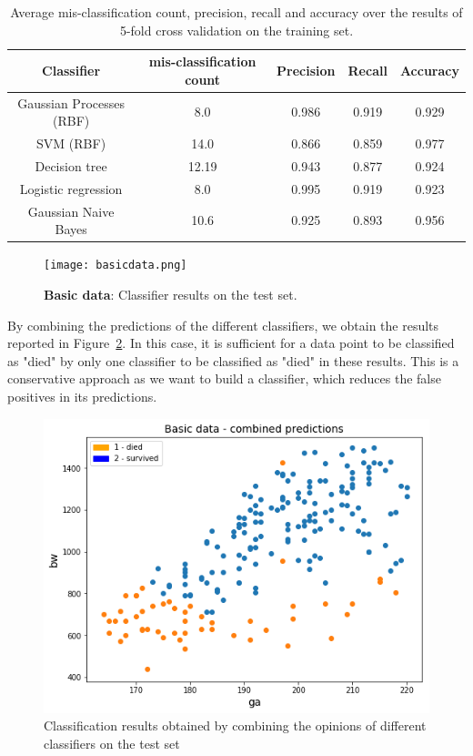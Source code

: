 \documentclass[a4paper,11pt]{article}
\begin{document}
\begin{table}[H]
    \centering
    \begin{tabular}{|c|c|c|c|c|}
    \hline
        Classifier & mis-classification count & Precision & Recall & Accuracy \\
    \hline
        Gaussian Processes (RBF)& 8.0   & 0.986 & 0.919 & 0.929\\
        SVM (RBF)               & 14.0  & 0.866 & 0.859 & 0.977\\
        Decision tree           & 12.19 & 0.943 & 0.877 & 0.924\\
        Logistic regression     & 8.0   & 0.995 & 0.919 & 0.923\\
        Gaussian Naive Bayes    & 10.6  & 0.925 & 0.893 & 0.956\\
    \hline
    \end{tabular}
    \caption{Average mis-classification count, precision, recall and accuracy over the results of 5-fold cross validation on the training set.}
    \label{tab:basicdatascores}
\end{table}

\begin{figure}[H]
    \centering
    \texttt{[image: basicdata.png]}
    \caption{\textbf{Basic data}: Classifier results on the test set.}
    \label{fig:basicdatatest}
\end{figure}

By combining the predictions of the different classifiers, we obtain the results reported in Figure~\ref{fig:basicdatacomb}. In this case, it is sufficient for a data point to be classified as "died" by only one classifier to be classified as "died" in these results. This is a conservative approach as we want to build a classifier, which reduces the false positives in its predictions.

\begin{figure}[H]
    \centering
    \includegraphics[width=0.7\linewidth]{basic_data_combined.png}
    \caption{Classification results obtained by combining the opinions of different classifiers on the test set}
    \label{fig:basicdatacomb}
\end{figure}
\end{document}
